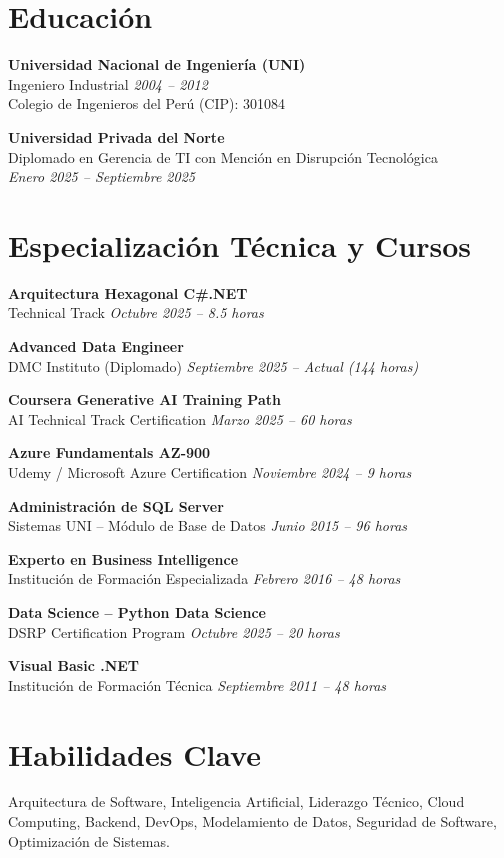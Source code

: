 \documentclass[11pt,a4paper]{article}
\begin{document}
\section*{Educación}

\textbf{Universidad Nacional de Ingeniería (UNI)}\\
Ingeniero Industrial \hfill \textit{2004 – 2012}\\
Colegio de Ingenieros del Perú (CIP): 301084

\vspace{0.2cm}

\textbf{Universidad Privada del Norte}\\
Diplomado en Gerencia de TI con Mención en Disrupción Tecnológica\\
\textit{Enero 2025 – Septiembre 2025}

\section*{Especialización Técnica y Cursos}

\textbf{Arquitectura Hexagonal C\#.NET}\\
Technical Track \hfill \textit{Octubre 2025 – 8.5 horas}

\textbf{Advanced Data Engineer }\\
DMC Instituto (Diplomado) \hfill \textit{Septiembre 2025 – Actual (144 horas)}

\textbf{Coursera Generative AI Training Path}\\
AI Technical Track Certification \hfill \textit{Marzo 2025 – 60 horas}

\textbf{Azure Fundamentals AZ-900}\\
Udemy / Microsoft Azure Certification \hfill \textit{Noviembre 2024 – 9 horas}

\textbf{Administración de SQL Server}\\
Sistemas UNI – Módulo de Base de Datos \hfill \textit{Junio 2015 – 96 horas}

\textbf{Experto en Business Intelligence}\\
Institución de Formación Especializada \hfill \textit{Febrero 2016 – 48 horas}

\textbf{Data Science – Python Data Science}\\
DSRP Certification Program \hfill \textit{Octubre 2025 – 20 horas}

\textbf{Visual Basic .NET}\\
Institución de Formación Técnica \hfill \textit{Septiembre 2011 – 48 horas}

\section*{Habilidades Clave}

Arquitectura de Software, Inteligencia Artificial, Liderazgo Técnico, Cloud Computing, Backend, DevOps, Modelamiento de Datos, Seguridad de Software, Optimización de Sistemas.
\end{document}
